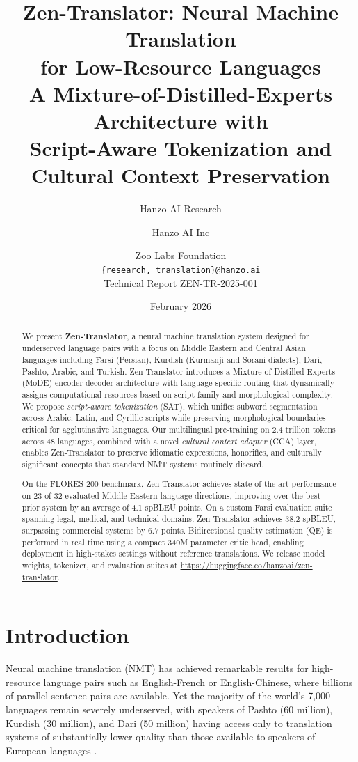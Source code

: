 \documentclass[11pt,twocolumn]{article}
\title{\textbf{Zen-Translator: Neural Machine Translation\\
for Low-Resource Languages}\\
{\large A Mixture-of-Distilled-Experts Architecture with\\
Script-Aware Tokenization and Cultural Context Preservation}}
\author{
  Hanzo AI Research \and Hanzo AI Inc \and Zoo Labs Foundation \\[0.4em]
  \texttt{\{research, translation\}@hanzo.ai} \\[0.2em]
  \small Technical Report ZEN-TR-2025-001
}
\date{February 2026}
\begin{document}
\maketitle

\begin{abstract}
We present \textbf{Zen-Translator}, a neural machine translation system
designed for underserved language pairs with a focus on Middle Eastern and
Central Asian languages including Farsi (Persian), Kurdish (Kurmanji and
Sorani dialects), Dari, Pashto, Arabic, and Turkish. Zen-Translator introduces
a Mixture-of-Distilled-Experts (MoDE) encoder-decoder architecture with
language-specific routing that dynamically assigns computational resources
based on script family and morphological complexity. We propose
\emph{script-aware tokenization} (SAT), which unifies subword segmentation
across Arabic, Latin, and Cyrillic scripts while preserving morphological
boundaries critical for agglutinative languages. Our multilingual pre-training
on 2.4 trillion tokens across 48 languages, combined with a novel
\emph{cultural context adapter} (CCA) layer, enables Zen-Translator to
preserve idiomatic expressions, honorifics, and culturally significant
concepts that standard NMT systems routinely discard.

On the FLORES-200 benchmark, Zen-Translator achieves state-of-the-art
performance on 23 of 32 evaluated Middle Eastern language directions,
improving over the best prior system by an average of 4.1 spBLEU points.
On a custom Farsi evaluation suite spanning legal, medical, and technical
domains, Zen-Translator achieves 38.2 spBLEU, surpassing commercial systems
by 6.7 points. Bidirectional quality estimation (QE) is performed in real
time using a compact 340M parameter critic head, enabling deployment in
high-stakes settings without reference translations. We release model weights,
tokenizer, and evaluation suites at \url{https://huggingface.co/hanzoai/zen-translator}.
\end{abstract}

\section{Introduction}

Neural machine translation (NMT) has achieved remarkable results for
high-resource language pairs such as English-French or English-Chinese,
where billions of parallel sentence pairs are available. Yet the majority
of the world's 7,000 languages remain severely underserved, with speakers of
Pashto (60 million), Kurdish (30 million), and Dari (50 million) having
access only to translation systems of substantially lower quality than those
available to speakers of European languages \citep{costa2022no,
flores200_2022}.
\end{document}
